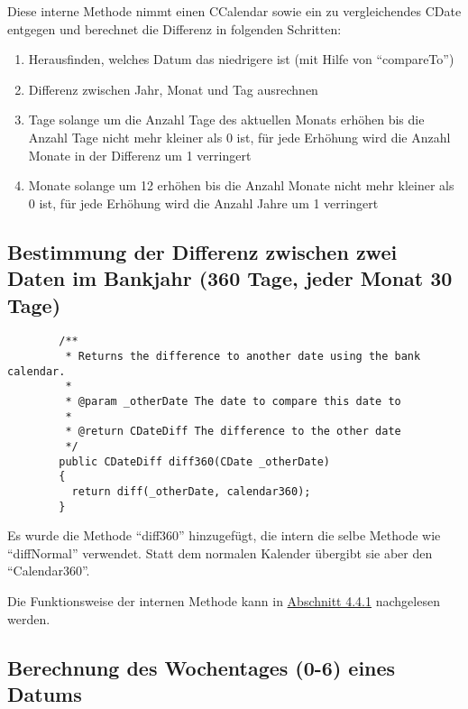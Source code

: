 \documentclass[12pt,pdftex,parskip=half]{scrartcl}
\begin{document}
    Diese interne Methode nimmt einen CCalendar sowie ein zu vergleichendes CDate entgegen und berechnet die Differenz in folgenden Schritten:

    \begin{enumerate}
      \item Herausfinden, welches Datum das niedrigere ist (mit Hilfe von "`compareTo"')
      \item Differenz zwischen Jahr, Monat und Tag ausrechnen
      \item Tage solange um die Anzahl Tage des aktuellen Monats erhöhen bis die Anzahl Tage nicht mehr kleiner als 0 ist, für jede Erhöhung wird die Anzahl Monate in der Differenz um 1 verringert
      \item Monate solange um 12 erhöhen bis die Anzahl Monate nicht mehr kleiner als 0 ist, für jede Erhöhung wird die Anzahl Jahre um 1 verringert
    \end{enumerate}

    \clearpage


    \subsection{Bestimmung der Differenz zwischen zwei Daten im Bankjahr (360 Tage, jeder Monat 30 Tage)}

    \begin{lstlisting}
        /**
         * Returns the difference to another date using the bank calendar.
         *
         * @param _otherDate The date to compare this date to
         *
         * @return CDateDiff The difference to the other date
         */
        public CDateDiff diff360(CDate _otherDate)
        {
          return diff(_otherDate, calendar360);
        }
    \end{lstlisting}

    Es wurde die Methode "`diff360"' hinzugefügt, die intern die selbe Methode wie "`diffNormal"' verwendet.
    Statt dem normalen Kalender übergibt sie aber den "`Calendar360"'.

    Die Funktionsweise der internen Methode kann in \hyperref[4.4.1]{\color{blue}Abschnitt 4.4.1} nachgelesen werden.

    \clearpage


    \subsection{Berechnung des Wochentages (0-6) eines Datums}
\end{document}
